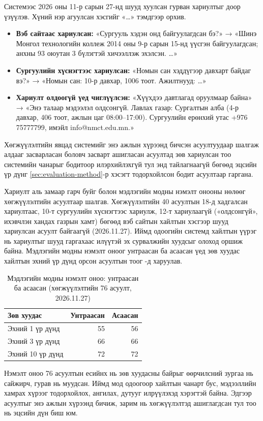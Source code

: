 Системээс 2026 оны 11-р сарын 27-нд шууд хуулсан гурван хариултыг доор үзүүлэв. Хүний нэр агуулсан хэсгийг «…» тэмдгээр орхив.
\begin{itemize}
    \item \textbf{Вэб сайтаас хариулсан:} «Сургууль хэдэн онд байгуулагдсан бэ?» → «Шинэ Монгол технологийн коллеж 2014 оны 9-р сарын 15-нд үүсгэн байгуулагдсан; анхны 93 оюутан 3 бүлэгтэй хичээллэж эхэлсэн. …»
    \item \textbf{Сургуулийн хүснэгтээс хариулсан:} «Номын сан хэддүгээр давхарт байдаг вэ?» → «Номын сан: 10-р давхар, 1006 тоот. Ажилтнууд: …»
    \item \textbf{Хариулт олдоогүй үед чиглүүлсэн:} «Хүүхдээ давтлагад оруулмаар байна» → «Энэ талаар мэдээлэл олдсонгүй. Лавлах газар: Сургалтын алба (4-р давхар, 406 тоот, ажлын цаг 08:00–17:00). Сургуулийн ерөнхий утас +976 75777799, имэйл info@nmct.edu.mn.»
\end{itemize}

Хөгжүүлэлтийн явцад системийг энэ ажлын хүрээнд бичсэн асуултуудаар шалгаж алдааг засварласан боловч засварт ашигласан асуултад зөв хариулсан тоо системийн чанарыг бодитоор илэрхийлэхгүй тул энд тайлагнаагүй бөгөөд эцсийн үр дүнг \ref{sec:evaluation-method}-р хэсэгт тодорхойлсон бодит асуултаар гаргана.

Хариулт аль замаар гарч буйг болон мэдлэгийн модны нэмэлт онооны нөлөөг хөгжүүлэлтийн асуултаар шалгав. Хөгжүүлэлтийн 40 асуултын 18-д хадгалсан хариултаас, 10-т сургуулийн хүснэгтээс хариулж, 12-т хариулаагүй («олдсонгүй», ихэвчлэн хандах газрын хамт) бөгөөд вэб сайтын хайлтын хэсгээр шууд хариулсан асуулт байгаагүй (2026.11.27). Иймд одоогийн системд хайлтын үүрэг нь хариултыг шууд гаргахаас илүүтэй эх сурвалжийн хуудсыг олоход оршиж байна. Мэдлэгийн модны нэмэлт оноог унтраасан ба асаасан үед зөв хуудас хайлтын эхний үр дүнд орсон асуултын тоог -д харуулав.

\begin{table}[htbp]
\centering
\caption{Мэдлэгийн модны нэмэлт оноо: унтраасан ба асаасан (хөгжүүлэлтийн 76 асуулт, 2026.11.27)}
\label{tab:tree_boost}
\begin{tabular}{|p{6.4cm}|r|r|}
\hline
\textbf{Зөв хуудас} & \textbf{Унтраасан} & \textbf{Асаасан} \\
\hline
Эхний 1 үр дүнд & 55 & 56 \\
\hline
Эхний 3 үр дүнд & 66 & 66 \\
\hline
Эхний 10 үр дүнд & 72 & 72 \\
\hline
\end{tabular}
\end{table}

Нэмэлт оноо 76 асуултын есийнх нь зөв хуудасны байрыг өөрчилсний зургаа нь сайжирч, гурав нь муудсан. Иймд мод одоогоор хайлтын чанарт бус, мэдээллийн хамрах хүрээг тодорхойлох, ангилах, дутууг илрүүлэхэд хэрэгтэй байна. Эдгээр асуултыг энэ ажлын хүрээнд бичиж, зарим нь хөгжүүлэлтэд ашиглагдсан тул тоо нь эцсийн дүн биш юм.

